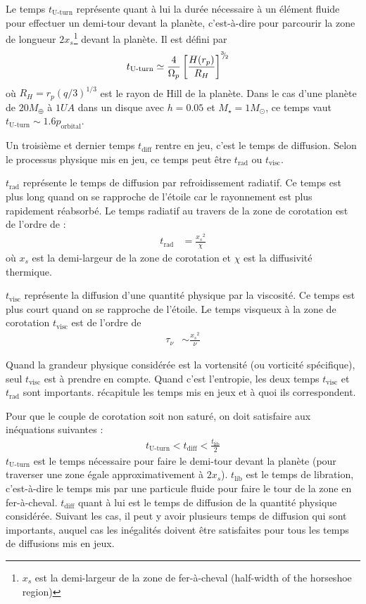 Le temps $t_\text{U-turn}$ représente quant à lui la durée nécessaire à un élément fluide pour effectuer un demi-tour devant la
planète, c'est-à-dire pour parcourir la zone de longueur $2x_s$\footnote{$x_s$ est la demi-largeur de la zone de fer-à-cheval
(\og half-width of the horseshoe region\fg)} devant la planète. Il est défini par \citep[eq. (64)]{baruteau2008corotation}
\begin{align}
t_\text{U-turn} &\simeq \frac{4}{\Omega_p}\left[\frac{H(r_p)}{R_H}\right]^{{}^{3\!\!}/ _{\!2}}
\end{align}
où $R_H=r_p (q/3)^{1/3}$ est le rayon de Hill de la planète. Dans le cas d'une planète de $20\unit{M_\oplus}$ à $1\unit{UA}$ dans un disque avec $h=0.05$ et $M_\star=1M_\odot$, ce temps vaut $t_\text{U-turn} \sim 1.6 p_\text{orbital}$.

Un troisième et dernier temps $t_\text{diff}$ rentre en jeu, c'est le temps de diffusion. Selon le processus physique mis en
jeu, ce temps peut être $t_\text{rad}$ ou $t_\text{visc}$.

$t_\text{rad}$ représente le temps de diffusion par refroidissement radiatif. Ce temps est plus long quand on se rapproche de l'étoile car le rayonnement est plus rapidement réabsorbé. Le temps radiatif au travers de la zone de corotation est de l'ordre de :
\begin{align}
t_\text{rad} &= \frac{{x_s}^2}{\chi}
\end{align}
où $x_s$ est la demi-largeur de la zone de corotation et $\chi$ est la diffusivité thermique.
 
$t_\text{visc}$ représente la diffusion d'une quantité physique par la viscosité. Ce temps est plus court quand on se rapproche de l'étoile. Le temps visqueux à la zone de corotation $t_\text{visc}$ est  de l'ordre de \citep{masset2001coorbital, masset2002coorbital, ogilvie2003saturation}
\begin{align}
\tau_\nu &\sim \frac{{x_s}^2}{\nu}
\end{align}

Quand la grandeur physique considérée est la vortensité (ou vorticité spécifique), seul $t_\text{visc}$ est à prendre en compte. Quand c'est l'entropie, les deux temps $t_\text{visc}$ et $t_\text{rad}$ sont importants.  récapitule les temps mis en jeux et à quoi ils correspondent.

\bigskip

Pour que le couple de corotation soit non saturé, on doit satisfaire aux inéquations suivantes \citep[eq. (31)]{baruteau2013recent} :
\begin{align}
t_\text{U-turn} < t_\text{diff} < \frac{t_\text{lib}}{2}
\end{align}
$t_\text{U-turn}$ est le temps nécessaire pour faire le demi-tour devant la planète (pour traverser une zone égale approximativement à $2x_s$). $t_\text{lib}$ est le temps de libration, c'est-à-dire le temps mis par une particule fluide pour faire le tour de la zone en fer-à-cheval. $t_\text{diff}$ quant à lui est le temps de diffusion de la quantité physique considérée. Suivant les cas, il peut y avoir plusieurs temps de diffusion qui sont importants, auquel cas les inégalités doivent être satisfaites pour tous les temps de diffusions mis en jeux.

